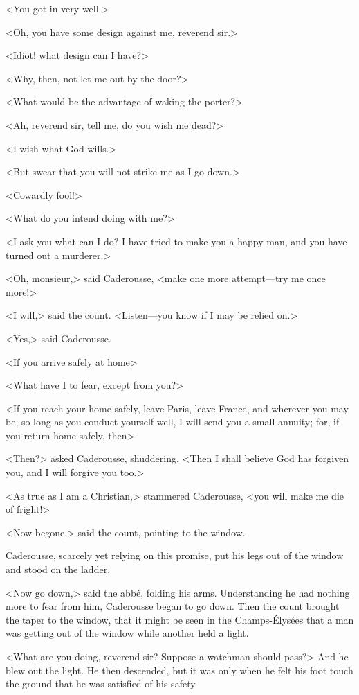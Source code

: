  <You got in very well.> 

 <Oh, you have some design against me, reverend sir.> 

 <Idiot! what design can I have?> 

 <Why, then, not let me out by the door?> 

 <What would be the advantage of waking the porter?> 

 <Ah, reverend sir, tell me, do you wish me dead?> 

 <I wish what God wills.> 

 <But swear that you will not strike me as I go down.> 

 <Cowardly fool!> 

 <What do you intend doing with me?> 

 <I ask you what can I do? I have tried to make you a happy man, and you have turned out a murderer.> 

 <Oh, monsieur,> said Caderousse, <make one more attempt—try me once more!> 

 <I will,> said the count. <Listen—you know if I may be relied on.> 

 <Yes,> said Caderousse. 

 <If you arrive safely at home\longdash> 

 <What have I to fear, except from you?> 

 <If you reach your home safely, leave Paris, leave France, and wherever you may be, so long as you conduct yourself well, I will send you a small annuity; for, if you return home safely, then\longdash> 

 <Then?> asked Caderousse, shuddering.  <Then I shall believe God has forgiven you, and I will forgive you too.> 

 <As true as I am a Christian,> stammered Caderousse, <you will make me die of fright!> 

 <Now begone,> said the count, pointing to the window. 

 Caderousse, scarcely yet relying on this promise, put his legs out of the window and stood on the ladder. 

 <Now go down,> said the abbé, folding his arms. Understanding he had nothing more to fear from him, Caderousse began to go down. Then the count brought the taper to the window, that it might be seen in the Champs-Élysées that a man was getting out of the window while another held a light. 

 <What are you doing, reverend sir? Suppose a watchman should pass?> And he blew out the light. He then descended, but it was only when he felt his foot touch the ground that he was satisfied of his safety. 


